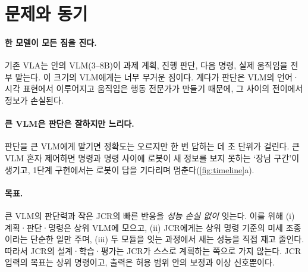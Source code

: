 \section{문제와 동기}
\label{sec:problem}

\paragraph{한 모델이 모든 짐을 진다.} 기존 VLA는 안의 VLM(3--8B)이 과제 계획, 진행 판단, 다음 명령, 실제 움직임을 전부 맡는다. 이 크기의 VLM에게는 너무 무거운 짐이다. 게다가 판단은 VLM의 언어·시각 표현에서 이루어지고 움직임은 행동 전문가가 만들기 때문에, 그 사이의 전이에서 정보가 손실된다.

\paragraph{큰 VLM은 판단은 잘하지만 느리다.} 판단을 큰 VLM에게 맡기면 정확도는 오르지만 한 번 답하는 데 초 단위가 걸린다. 큰 VLM 혼자 제어하면 명령과 명령 사이에 로봇이 새 정보를 보지 못하는 `장님 구간'이 생기고, 1단계 구현에서는 로봇이 답을 기다리며 멈춘다(\cref{fig:timeline}a).

\paragraph{목표.} 큰 VLM의 판단력과 작은 JCR의 빠른 반응을 \emph{성능 손실 없이} 잇는다. 이를 위해 (i) 계획·판단·명령은 상위 VLM에 모으고, (ii) JCR에게는 상위 명령 기준의 미세 조종이라는 단순한 일만 주며, (iii) 두 모듈을 잇는 과정에서 새는 성능을 직접 재고 줄인다. 따라서 JCR의 설계·학습·평가는 JCR가 스스로 계획하는 쪽으로 가지 않는다. JCR 입력의 목표는 상위 명령이고, 출력은 허용 범위 안의 보정과 이상 신호뿐이다.
